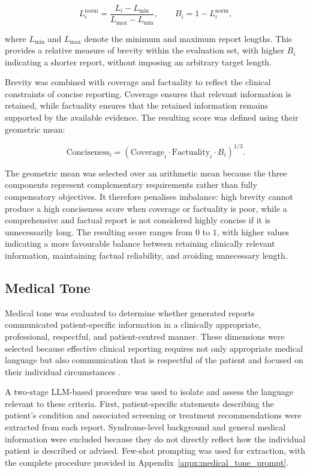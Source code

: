 \documentclass[ %
                    author={Aman Kumar Singh},
                supervisor={Dr. Edwin Simpson},
                    degree={MSc},
                     title={Quality-Aware Knowledge Distillation of Large Language Models for Efficient Personalised Clinical Report Generation},
                  subtitle={},
                      type={},
                      year={2021}]{dissertation}
\begin{document}
\begin{equation}
L_i^{\mathrm{norm}}
=
\frac{L_i-L_{\min}}{L_{\max}-L_{\min}},
\qquad
B_i = 1-L_i^{\mathrm{norm}},
\end{equation}

where $L_{\min}$ and $L_{\max}$ denote the minimum and maximum report
lengths. This provides a relative measure of brevity within the evaluation
set, with higher $B_i$ indicating a shorter report, without imposing an
arbitrary target length.

Brevity was combined with coverage and factuality to reflect the clinical
constraints of concise reporting. Coverage ensures that relevant
information is retained, while factuality ensures that the retained
information remains supported by the available evidence. The resulting
score was defined using their geometric mean:

\begin{equation}
\mathrm{Conciseness}_i
=
\left(
\mathrm{Coverage}_i
\cdot
\mathrm{Factuality}_i
\cdot
B_i
\right)^{1/3}.
\end{equation}

The geometric mean was selected over an arithmetic mean because the three
components represent complementary requirements rather than fully
compensatory objectives. It therefore penalises imbalance: high brevity
cannot produce a high conciseness score when coverage or factuality is
poor, while a comprehensive and factual report is not considered highly
concise if it is unnecessarily long. The resulting score ranges from $0$
to $1$, with higher values indicating a more favourable balance between
retaining clinically relevant information, maintaining factual reliability,
and avoiding unnecessary length.
\subsection{Medical Tone}
\label{sec:medical_tone}

Medical tone was evaluated to determine whether generated reports
communicated patient-specific information in a clinically appropriate,
professional, respectful, and patient-centred manner. These dimensions were
selected because effective clinical reporting requires not only appropriate
medical language but also communication that is respectful of the patient
and focused on their individual circumstances
\cite{bowden_evaluating_nodate,rattanapitoon_beyond_2025,omar_impact_2025}.

A two-stage LLM-based procedure was used to isolate and assess the language
relevant to these criteria. First, patient-specific statements describing
the patient's condition and associated screening or treatment
recommendations were extracted from each report. Syndrome-level background
and general medical information were excluded because they do not directly
reflect how the individual patient is described or advised. Few-shot
prompting was used for extraction, with the complete procedure provided in
Appendix~\ref{appx:medical_tone_prompt}.
\end{document}
